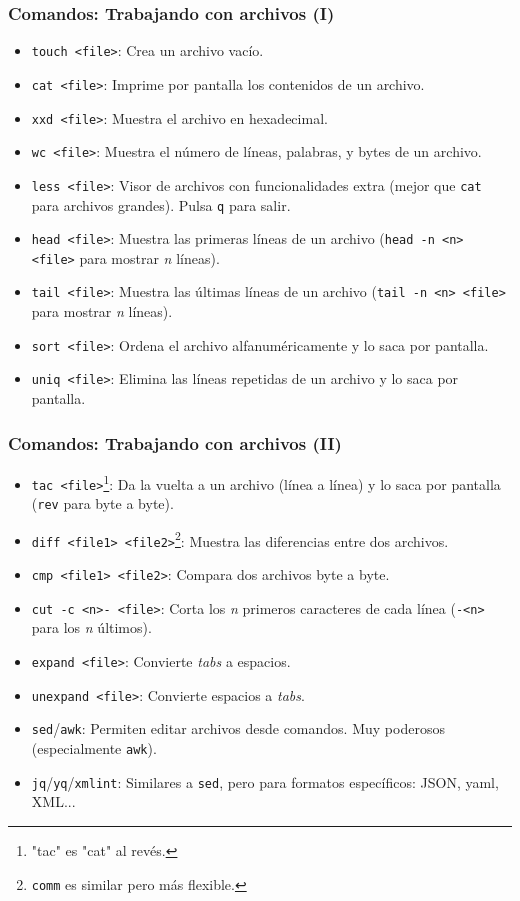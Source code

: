 \documentclass[aspectratio=43]{beamer}
\begin{document}
\begin{frame}
    \frametitle{Comandos: Trabajando con archivos (I)}

    \begin{itemize}
        \item \texttt{touch <file>}: Crea un archivo vacío.
        \item \texttt{cat <file>}: Imprime por pantalla los contenidos de un archivo.
        \item \texttt{xxd <file>}: Muestra el archivo en hexadecimal.
        \item \texttt{wc <file>}: Muestra el número de líneas, palabras, y bytes de un archivo.
        \item \texttt{less <file>}: Visor de archivos con funcionalidades extra (mejor que \texttt{cat} para archivos grandes). Pulsa \texttt{q} para salir.
        \item \texttt{head <file>}: Muestra las primeras líneas de un archivo (\texttt{head -n <n> <file>} para mostrar \textit{n} líneas).
        \item \texttt{tail <file>}: Muestra las últimas líneas de un archivo (\texttt{tail -n <n> <file>} para mostrar \textit{n} líneas).
        \item \texttt{sort <file>}: Ordena el archivo alfanuméricamente y lo saca por pantalla.
        \item \texttt{uniq <file>}: Elimina las líneas repetidas de un archivo y lo saca por pantalla.
    \end{itemize}
\end{frame}

\begin{frame}
    \frametitle{Comandos: Trabajando con archivos (II)}

    \begin{itemize}
        \item \texttt{tac <file>}\footnote{"tac" es "cat" al revés.}: Da la vuelta a un archivo (línea a línea) y lo saca por pantalla (\texttt{rev} para byte a byte).
        \item \texttt{diff <file1> <file2>}\footnote{\texttt{comm} es similar pero más flexible.}: Muestra las diferencias entre dos archivos.
        \item \texttt{cmp <file1> <file2>}: Compara dos archivos byte a byte.
        \item \texttt{cut -c <n>- <file>}: Corta los \textit{n} primeros caracteres de cada línea (\texttt{-<n>} para los \textit{n} últimos).
        \item \texttt{expand <file>}: Convierte \textit{tabs} a espacios.
        \item \texttt{unexpand <file>}: Convierte espacios a \textit{tabs}.
        \item \texttt{sed}/\texttt{awk}: Permiten editar archivos desde comandos. Muy poderosos (especialmente \texttt{awk}).
        \item \texttt{jq}/\texttt{yq}/\texttt{xmlint}: Similares a \texttt{sed}, pero para formatos específicos: JSON, yaml, XML...
    \end{itemize}
\end{frame}
\end{document}
